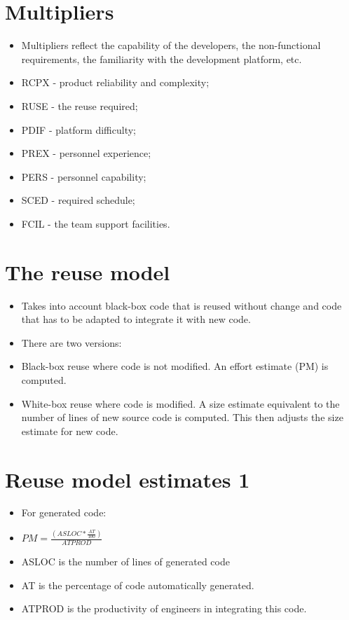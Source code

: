  \section{Multipliers}
 \begin{itemize}

\item Multipliers reflect the capability of the developers, the non-functional requirements, the familiarity with the development platform, etc.

  \item RCPX - product reliability and complexity;   \item RUSE - the reuse required;
  \item PDIF - platform difficulty;   \item PREX - personnel experience;   \item PERS - personnel capability;   \item SCED - required schedule;   \item FCIL - the team support facilities.
\end{itemize}
\section{The reuse model}
\begin{itemize}

\item Takes into account black-box code that is reused without change and code that has to be adapted to integrate it with new code.

\item There are two versions:

  \item Black-box reuse where code is not modified. An effort estimate (PM) is computed.
  \item White-box reuse where code is modified. A size estimate equivalent to the number of lines of new source code is computed. This then adjusts the size estimate for new code.
\end{itemize}
\section{Reuse model estimates 1}
\begin{itemize}

\item For generated code:

  \item $PM = \frac{(ASLOC * \frac{AT}{100})}{ATPROD}$

  \item ASLOC is the number of lines of generated code   \item AT is the percentage of code automatically generated.
  \item ATPROD is the productivity of engineers in integrating this code.
\end{itemize}
